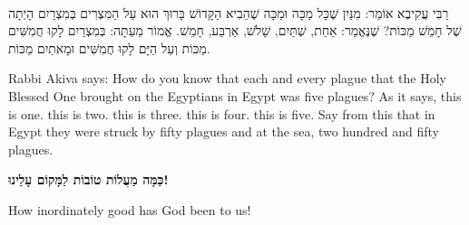\ \\

רַבִּי עֲקִיבֶא אוֹמֵר: מִנַּיִן שֶׁכָּל מַכָּה וּמַכָּה שֶׁהֵבִיא הַקָּדוֹשׁ בָּרוּךְ הוּא עַל הַמִּצְרִים בְּמִצְרַיִם הָיְתָה שֶׁל חָמֵשׁ מַכּוֹת? שֶׁנֶּאֱמַר:
אַחַת,
שְׁתַּיִם,
שָׁלֹשׁ,
אַרְבַּע,
חָמֵשׁ. אֱמוֹר מֵעַתָּה: בְּמִצְרַיִם לָקוּ חֲמִשִּׁים מַכּוֹת וְעַל הַיָּם לָקוּ חֲמִשִּׁים וּמָאתַיִם מַכּוֹת.

\begin{english}
Rabbi Akiva says: How do you know that each and every plague that the Holy Blessed One brought on the Egyptians in Egypt was five plagues? As it says,   this is one.  this is two.  this is three.  this is four.  this is five. Say from this that in Egypt they were struck by fifty plagues and at the sea, two hundred and fifty plagues.
\end{english}

\break

{\bf
כַּמָּה מַעֲלוֹת טוֹבוֹת לַמָּקוֹם עָלֵינוּ!
}

\begin{english}
How inordinately good has God been to us!
\end{english}


